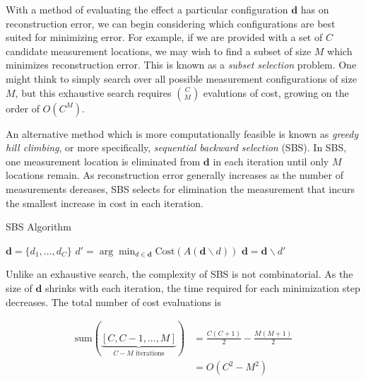 \documentclass{article}
\begin{document}
With a method of evaluating the effect a particular configuration $\bm{d}$ has
on reconstruction error, we can begin considering which configurations are best
suited for minimizing error.  For example, if we are provided with a set of $C$
candidate measurement locations, we may wish to find a subset of size $M$ which
minimizes reconstruction error. This is known as a \emph{subset selection} problem.
One might think to simply  search over all possible measurement configurations
of size $M$, but this exhaustive search requires $\binom{C}{M}$ evalutions of
cost, growing on the order of $O(C^M)$.

An alternative method which is more computationally feasible is known as
\emph{greedy hill climbing}, or more specifically, \emph{sequential backward
selection} (SBS). In SBS, one measurement location is eliminated from $\bm{d}$ in each
iteration until only $M$ locations remain. As reconstruction error generally
increases as the number of measurements dereases, SBS selects for elimination the
measurement that incurs the smallest increase in cost in each iteration.

\begin{algorithm}
  \begin{algorithmic}
    \caption{SBS Algorithm}
    \State $\bm{d} = \{d_1, \dots, d_C\}$
    \Repeat
      \State $d' = \arg \min_{d \in \bm{d}} \text{Cost}(A(\bm{d} \backslash d))$
      \State $\bm{d} = \bm{d} \backslash d'$
  \end{algorithmic}
\end{algorithm}

Unlike an exhaustive search, the complexity of SBS is not combinatorial.  As the
size of $\bm{d}$ shrinks with each iteration, the time required for each
minimization step decreases.  The total number of cost evaluations is

$$
\begin{aligned}
  \text{sum}(\underbrace{[C, C - 1, ..., M]}_{C - M \text{ iterations}})
  &= \frac{C
    (C + 1)}{2} - \frac{M(M + 1)}{2} \\
  &= O(C^2 - M^2)
\end{aligned}
$$
\end{document}
